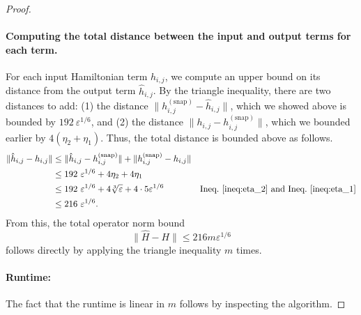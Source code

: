 \documentclass[a4paper,onecolumn,11pt]{quantumarticle}
\theoremstyle{plain}
\newcommand{\eps}{\varepsilon}
\newcommand{\snp}{{(\mathrm{snap})}}
\begin{document}
\begin{proof}
\paragraph{Computing the total distance between the input and output terms for each term.}
For each input Hamiltonian term $h_{i,j}$, we compute an upper bound on its distance from the output term $\hat{h}_{i,j}$. By the triangle inequality, there are two distances to add: (1) the distance $\|h^\snp_{i,j} - \hat{h}_{i,j}\|$, which we showed above is bounded by $192\ \eps^{1/6}$, and (2) the distance $\|h_{i,j} - h^\snp_{i,j} \|$, which we bounded earlier by $4 (\eta_2 + \eta_1)$. Thus, the total distance is bounded above as follows.
\begin{align*}
    \|\hat{h}_{i,j} - h_{i,j}\| &\leq \|\hat{h}_{i,j} - h^\snp_{i,j}\| + \|h^\snp_{i,j} - h_{i,j}\|\\
    & \leq 192\ \eps^{1/6} + 4 \eta_2 + 4 \eta_1\\
    & \leq 192\ \eps^{1/6} + 4 \sqrt[3]{\eps} + 4 \cdot 5 \eps^{1/6} & \text{Ineq.~\ref{ineq:eta_2} and Ineq.~\ref{ineq:eta_1}}\\
    & \leq 216\ \eps^{1/6}.
\end{align*}
From this, the total operator norm bound
\[ \|\hat{H} - H \| \leq 216 m \eps^{1/6} \]
follows directly by applying the triangle inequality $m$ times.

\paragraph{Runtime:} The fact that the runtime is linear in $m$ follows by inspecting the algorithm.
\end{proof}
\end{document}
